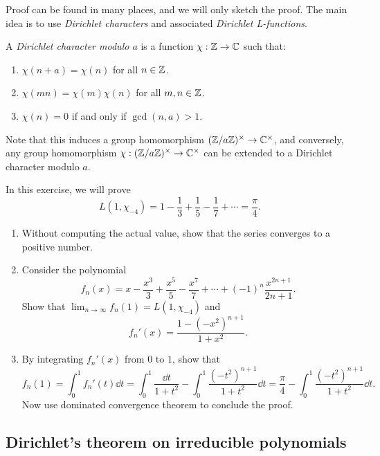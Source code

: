 Proof can be found in many places, and we will only sketch the proof.
The main idea is to use \emph{Dirichlet characters} and associated \emph{Dirichlet L-functions}.
\begin{definition}
    A \emph{Dirichlet character modulo $a$} is a function $\chi: \mathbb{Z} \to \mathbb{C}$ such that:
    \begin{enumerate}
        \item $\chi(n + a) = \chi(n)$ for all $n \in \mathbb{Z}$.
        \item $\chi(mn) = \chi(m)\chi(n)$ for all $m, n \in \mathbb{Z}$.
        \item $\chi(n) = 0$ if and only if $\gcd(n, a) > 1$.
    \end{enumerate}
\end{definition}
Note that this induces a group homomorphism $(\mathbb{Z} / a\mathbb{Z})^\times \to \mathbb{C}^\times$, and conversely, any group homomorphism $\chi: (\mathbb{Z} / a\mathbb{Z})^\times \to \mathbb{C}^\times$ can be extended to a Dirichlet character modulo $a$.

\begin{exercise}
    In this exercise, we will prove 
    \begin{equation}
        L(1, \chi_{-4}) = 1 - \frac{1}{3} + \frac{1}{5} - \frac{1}{7} + \cdots = \frac{\pi}{4}.
    \end{equation}
    \begin{enumerate}
        \item Without computing the actual value, show that the series converges to a positive number.
        \item Consider the polynomial
        \[
        f_n(x) = x - \frac{x^3}{3} + \frac{x^5}{5} - \frac{x^7}{7} + \cdots + (-1)^n \frac{x^{2n + 1}}{2n + 1}.
        \]
        Show that $\lim_{n \to \infty} f_n(1) = L(1, \chi_{-4})$ and
        \[
        f_n'(x) = \frac{1 - (-x^2)^{n+1}}{1 + x^2}.
        \]
        \item By integrating $f_n'(x)$ from $0$ to $1$, show that
        \[
        f_n(1) = \int_0^1 f_n'(t) \dd t = \int_0^1 \frac{\dd t}{1 + t^2} - \int_0^1 \frac{(-t^2)^{n+1}}{1 + t^2} \dd t = \frac{\pi}{4} - \int_0^1 \frac{(-t^2)^{n+1}}{1 + t^2} \dd t.
        \]
        Now use dominated convergence theorem to conclude the proof.
    \end{enumerate}
\end{exercise}

\subsection{Dirichlet's theorem on irreducible polynomials}
\label{sec:dirichlet-polynomials}

